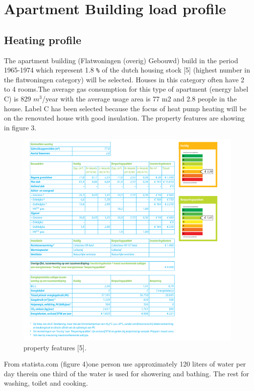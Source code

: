 \documentclass[a4paper,10pt]{article}
\begin{document}

\section{Apartment Building load profile}
\subsection{Heating profile}

The apartment building (Flatwoningen (overig) Gebouwd) build in the period 1965-1974 which represent 1.8 \texttt{\%} of the dutch housing stock [5] (highest number in the flatwoningen category) will be selected. Houses in this category often have 2 to 4 rooms.The average gas consumption for this type of apartment (energy label C) is 829 $m^3$/year with the average usage area is 77 m2 and 2.8 people in the house. Label C has been selected because the focus of heat pump heating will be on the renovated house with good insulation. The property features are showing in figure 3.

\begin{figure}[H]
\centering
\includegraphics[width=1\columnwidth]{pictures/property features.png}
\caption[Short title]{property features [5].}
\label{fig:ff3}\end{figure}
From statista.com (figure 4)one person use approximately 120 liters of water per day therein one third of the water is used for showering and bathing. The rest for washing, toilet and cooking.
\end{document}
